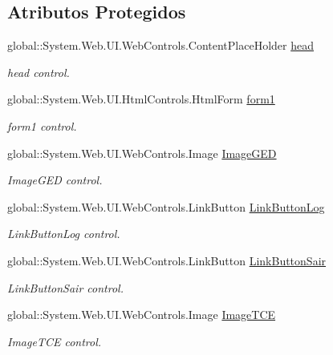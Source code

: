 \subsection*{Atributos Protegidos}
\begin{DoxyCompactItemize}
\item 
global::System.Web.UI.WebControls.ContentPlaceHolder \hyperlink{class_sistema_r_h_1_1_site1_a787750eff16f448a0cb55e3eb6a0c9af}{head}
\begin{DoxyCompactList}\small\item\em head control. \item\end{DoxyCompactList}\item 
global::System.Web.UI.HtmlControls.HtmlForm \hyperlink{class_sistema_r_h_1_1_site1_ab54b21b54025b52cd7d20a2f88de7d6e}{form1}
\begin{DoxyCompactList}\small\item\em form1 control. \item\end{DoxyCompactList}\item 
global::System.Web.UI.WebControls.Image \hyperlink{class_sistema_r_h_1_1_site1_aa109f82fe67ae9f8c83281567a483b27}{ImageGED}
\begin{DoxyCompactList}\small\item\em ImageGED control. \item\end{DoxyCompactList}\item 
global::System.Web.UI.WebControls.LinkButton \hyperlink{class_sistema_r_h_1_1_site1_aefccf7ce2dd552821210010a288905e8}{LinkButtonLog}
\begin{DoxyCompactList}\small\item\em LinkButtonLog control. \item\end{DoxyCompactList}\item 
global::System.Web.UI.WebControls.LinkButton \hyperlink{class_sistema_r_h_1_1_site1_a8ea66e9b8c9d558362fbcc038e0148fc}{LinkButtonSair}
\begin{DoxyCompactList}\small\item\em LinkButtonSair control. \item\end{DoxyCompactList}\item 
global::System.Web.UI.WebControls.Image \hyperlink{class_sistema_r_h_1_1_site1_a463eb7707d2ce6285c3719aabb2782bd}{ImageTCE}
\begin{DoxyCompactList}\small\item\em ImageTCE control. \item\end{DoxyCompactList}\item 

\end{DoxyCompactItemize}
